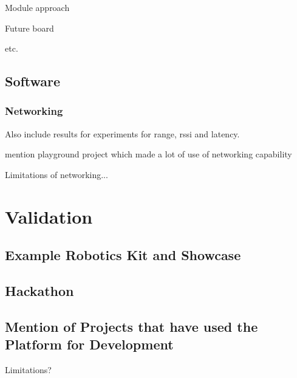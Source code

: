Module approach

Future board

etc.

\subsection{\label{sec:res_software}Software}

\subsubsection{\label{sec:res_networking}Networking}%

Also include results for experiments for range, rssi and latency.

mention playground project which made a lot of use of networking capability

Limitations of networking...

\section{\label{sec:res_validation}Validation}

\subsection{\label{sec:res_examplekit}Example Robotics Kit and Showcase}

\subsection{\label{sec:res_hackathon}Hackathon}

\subsection{\label{sec:res_honourablementions}Mention of Projects that have used the Platform for Development}

Limitations?
